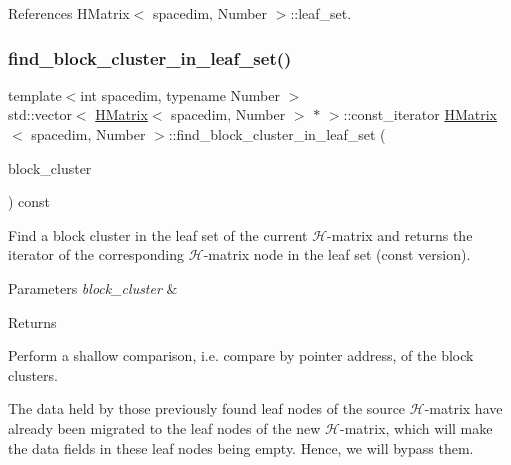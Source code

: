 References H\+Matrix$<$ spacedim, Number $>$\+::leaf\+\_\+set.

\mbox{\label{classHMatrix_a723cc200afe31148fcc28f0120c5ec54}} 
\subsubsection{\texorpdfstring{find\+\_\+block\+\_\+cluster\+\_\+in\+\_\+leaf\+\_\+set()}{find\_block\_cluster\_in\_leaf\_set()}\hspace{0.1cm}{\footnotesize\ttfamily [2/2]}}
{\footnotesize\ttfamily template$<$int spacedim, typename Number $>$ \\
std\+::vector$<$ \hyperlink{classHMatrix}{H\+Matrix}$<$ spacedim, Number $>$ $\ast$ $>$\+::const\+\_\+iterator \hyperlink{classHMatrix}{H\+Matrix}$<$ spacedim, Number $>$\+::find\+\_\+block\+\_\+cluster\+\_\+in\+\_\+leaf\+\_\+set (\begin{DoxyParamCaption}\item[{const \hyperlink{classBlockCluster}{Block\+Cluster}$<$ spacedim, Number $>$ \&}]{block\+\_\+cluster }\end{DoxyParamCaption}) const}

Find a block cluster in the leaf set of the current $\mathcal{H}$-\/matrix and returns the iterator of the corresponding $\mathcal{H}$-\/matrix node in the leaf set (const version).


\begin{DoxyParams}{Parameters}
{\em block\+\_\+cluster} & \\
\hline
\end{DoxyParams}
\begin{DoxyReturn}{Returns}

\end{DoxyReturn}
Perform a shallow comparison, i.\+e. compare by pointer address, of the block clusters.


\begin{DoxyDescription}
\item[Note ]The data held by those previously found leaf nodes of the source $\mathcal{H}$-\/matrix have already been migrated to the leaf nodes of the new $\mathcal{H}$-\/matrix, which will make the data fields in these leaf nodes being empty. Hence, we will bypass them. 
\end{DoxyDescription}


